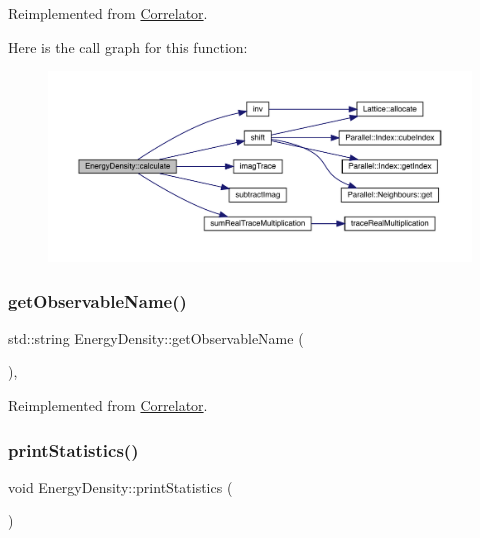 Reimplemented from \mbox{\hyperlink{class_correlator_ab33502ff305f891c5c2e6d66a26a0247}{Correlator}}.

Here is the call graph for this function\+:\nopagebreak
\begin{figure}[H]
\begin{center}
\leavevmode
\includegraphics[width=350pt]{class_energy_density_ae8e5e29257104d881bcabeadc3b2c9e7_cgraph}
\end{center}
\end{figure}
\mbox{\label{class_energy_density_a59b320595bca439333d36e3753ca07f0}} 
\subsubsection{\texorpdfstring{getObservableName()}{getObservableName()}}
{\footnotesize\ttfamily std\+::string Energy\+Density\+::get\+Observable\+Name (\begin{DoxyParamCaption}{ }\end{DoxyParamCaption})\hspace{0.3cm}{\ttfamily [inline]}, {\ttfamily [virtual]}}



Reimplemented from \mbox{\hyperlink{class_correlator_ad1fa59e864917c3e48da037f90c3488f}{Correlator}}.

\mbox{\label{class_energy_density_ad108e32bc670f17f15b4ed433d8bbec7}} 
\subsubsection{\texorpdfstring{printStatistics()}{printStatistics()}}
{\footnotesize\ttfamily void Energy\+Density\+::print\+Statistics (\begin{DoxyParamCaption}{ }\end{DoxyParamCaption})\hspace{0.3cm}{\ttfamily [virtual]}}



